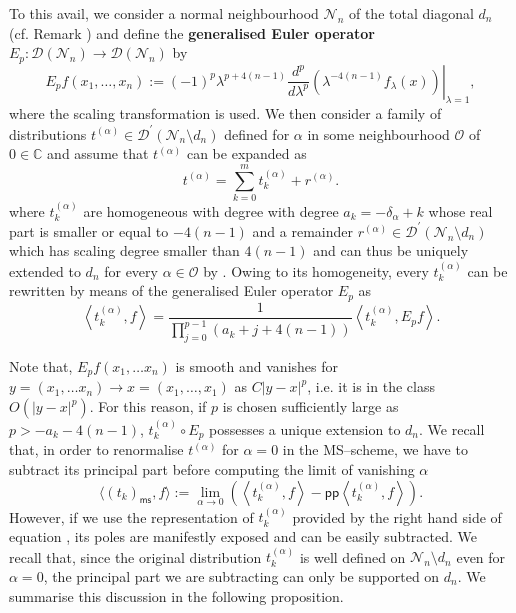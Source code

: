\documentclass[10pt]{book}
\newcommand{\pp}{\mathsf{pp}}
\newcommand{\ms}{\mathsf{ms}}
\newcommand{\Dcal}{\mathcal{D}}
\newcommand{\Ncal}{\mathcal{N}}
\newcommand{\Ocal}{\mathcal{O}}
\theoremstyle{break}
\begin{document}
To this avail, we consider a normal neighbourhood $\Ncal_n$ of the total diagonal $d_n$ (cf. Remark %
) and define the {\bf generalised Euler operator} $E_p:\Dcal(\Ncal_n)\to\Dcal(\Ncal_n)$ by
%
\begin{equation*}
E_p f (x_1,\dots, x_n) := (-1)^p \left. \lambda^{p+4(n-1)} \frac{d^p}{d\lambda^p}\left( \lambda^{-4(n-1)}  f_\lambda(x)\right)\right|_{\lambda = 1},
\end{equation*}
%
where the scaling transformation %
is used. We then consider a family of distributions $t^{(\alpha)}\in \Dcal^\prime(\Ncal_n\setminus d_n)$ defined for $\alpha$ in some neighbourhood $\Ocal$ of $0\in \mathbb{C}$ and assume that $t^{(\alpha)}$ can be expanded as
%
\[
t^{(\alpha)}  = \sum_{k=0}^m t^{(\alpha)}_k + r^{(\alpha)}.
\]
%
where $t^{(\alpha)}_k$ are homogeneous with degree with degree $a_k=-\delta_\alpha+k$ whose real part is smaller or equal to $-4(n-1)$ and a remainder $r^{(\alpha)}\in \Dcal^\prime(\Ncal_n\setminus d_n)$ which has scaling degree smaller than $4(n-1)$ and can thus be uniquely extended to $d_n$ for every $\alpha\in \Ocal$ by %
. Owing to its homogeneity, every $t^{(\alpha)}_k$ can be rewritten by means of the generalised Euler operator $E_p$ as
\begin{equation*}
\left\langle t^{(\alpha)}_k, f \right\rangle   =   \frac{1}{\prod_{j=0}^{p-1} (a_k+j+4(n-1))}   \left \langle t^{(\alpha)}_k, E_p f \right\rangle.
\end{equation*}

Note that, $E_p f(x_1, \dots x_n)$ is smooth and vanishes for $y=(x_1, \dots x_n) \to x=(x_1, \dots, x_1)$ as $C|y-x|^p$, i.e. it is in the class $O(|y-x|^{p})$. For this reason, if  $p$ is chosen sufficiently large as $p > -a_k-4(n-1)$, $t^{(\alpha)}_k\circ E_p$ possesses a unique extension to $d_n$. We recall that, in order to renormalise $t^{(\alpha)}$ for $\alpha=0$ in the MS--scheme, we have to subtract its principal part before computing the limit of vanishing $\alpha$
\[
\langle (t_k)_\ms, f \rangle:=\lim_{\alpha\to 0 } \left(\left\langle t^{(\alpha)}_k, f \right\rangle - \pp \left\langle t^{(\alpha)}_k, f \right\rangle  \right).
\]
However, if we use the representation of $t^{(\alpha)}_k$ provided by the right hand side of equation %
, its poles are manifestly exposed and can be easily subtracted.
We recall that, since the original distribution $t^{(\alpha)}_k$ is well defined on $\Ncal_n\setminus d_n$ even for $\alpha=0$, the principal part we are subtracting can only be supported on $d_n$. We summarise this discussion in the following proposition.
\end{document}
